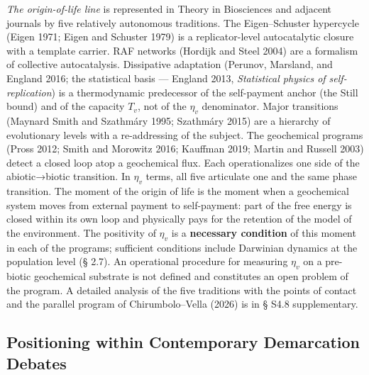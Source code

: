 \documentclass[pdflatex,sn-mathphys-ay]{sn-jnl}
\begin{document}
\emph{The origin-of-life line} is represented in Theory in Biosciences and adjacent journals by five relatively autonomous traditions. The Eigen--Schuster hypercycle (Eigen 1971; Eigen and Schuster 1979) is a replicator-level autocatalytic closure with a template carrier. RAF networks (Hordijk and Steel 2004) are a formalism of collective autocatalysis. Dissipative adaptation (Perunov, Marsland, and England 2016; the statistical basis --- England 2013, \emph{Statistical physics of self-replication}) is a thermodynamic predecessor of the self-payment anchor (the Still bound) and of the capacity \(T_v\), not of the \(\eta_v\) denominator. Major transitions (Maynard Smith and Szathmáry 1995; Szathmáry 2015) are a hierarchy of evolutionary levels with a re-addressing of the subject. The geochemical programs (Pross 2012; Smith and Morowitz 2016; Kauffman 2019; Martin and Russell 2003) detect a closed loop atop a geochemical flux. Each operationalizes one side of the abiotic→biotic transition. In \(\eta_v\) terms, all five articulate one and the same phase transition. The moment of the origin of life is the moment when a geochemical system moves from external payment to self-payment: part of the free energy is closed within its own loop and physically pays for the retention of the model of the environment. The positivity of \(\eta_v\) is a \textbf{necessary condition} of this moment in each of the programs; sufficient conditions include Darwinian dynamics at the population level (§ 2.7). An operational procedure for measuring \(\eta_v\) on a pre-biotic geochemical substrate is not defined and constitutes an open problem of the program. A detailed analysis of the five traditions with the points of contact and the parallel program of Chirumbolo--Vella (2026) is in § S4.8 supplementary.

\subsection{Positioning within Contemporary Demarcation Debates}\label{positioning-within-contemporary-demarcation-debates}
\end{document}
